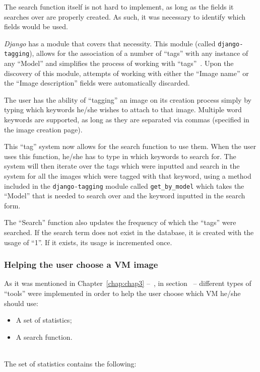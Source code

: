 The search function itself is not hard to implement, as long as the fields it searches over are properly created. As such, it was necessary to identify which fields would be used.

\textit{Django} has a module that covers that necessity. This module (called \texttt{django-tagging}), allows for the association of a number of ``tags'' with any instance of any ``Model'' and simplifies the process of working with ``tags''~\cite{django-tagging}. Upon the discovery of this module, attempts of working with either the ``Image name'' or the ``Image description'' fields were automatically discarded.

The user has the ability of ``tagging'' an image on its creation process simply by typing which keywords he/she wishes to attach to that image. Multiple word keywords are supported, as long as they are separated via commas (specified in the image creation page).

This ``tag'' system now allows for the search function to use them. When the user uses this function, he/she has to type in which keywords to search for. The system will then iterate over the tags which were inputted and search in the system for all the images which were tagged with that keyword, using a method included in the \texttt{django-tagging} module called \texttt{get\_by\_model} which takes the ``Model'' that is needed to search over and the keyword inputted in the search form.

The ``Search'' function also updates the frequency of which the ``tags'' were searched. If the search term does not exist in the database, it is created with the usage of ``1''. If it exists, its usage is incremented once.

\subsubsection{Helping the user choose a VM image}

As it was mentioned in Chapter~\ref{chap:chap3} --~, in section~ -- different types of ``tools'' were implemented in order to help the user choose which VM he/she should use:

\begin{itemize}
\item A set of statistics;
\item A search function.
\end{itemize}

\ \\
The set of statistics contains the following:

